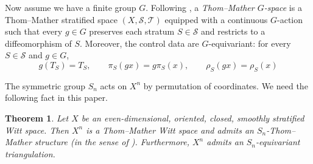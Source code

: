 \documentclass[11pt,leqno,twoside]{amsart}
\theoremstyle{plainsl}
\newtheorem{theorem}{Theorem}[section]
\theoremstyle{definition}
\begin{document}
Now assume we have a finite group $G$. Following \cite[Definition 2.1]{BLP}, a
\emph{Thom--Mather $G$-space} is a Thom--Mather stratified space
$(X,\mathcal S,\mathcal T)$ equipped with a continuous
$G$-action such that every $g\in G$ preserves each
stratum $S\in\mathcal S$ and restricts to a diffeomorphism
of $S$. Moreover, the control data are $G$-equivariant:
for every $S\in\mathcal S$ and $g\in G$,
\[
g(T_S)=T_S,\qquad
\pi_S(gx)=g\pi_S(x),\qquad
\rho_S(gx)=\rho_S(x)
\]



The symmetric group $S_n$ acts on $X^n$ by permutation of coordinates. We need the following fact in this paper.




\begin{theorem}\label{Sn-mather-X^n}
Let $X$ be an even-dimensional, oriented, closed, smoothly stratified Witt space. Then $X^n$ is a Thom--Mather Witt space and admits an $S_n$-Thom--Mather structure (in the sense of \cite{BLP}). Furthermore, $X^n$ admits an $S_n$-equivariant triangulation.
\end{theorem}
\end{document}
